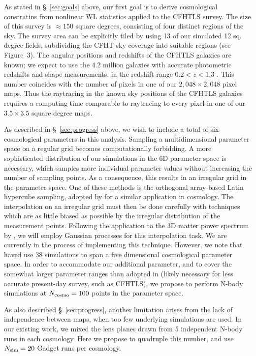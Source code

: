 \documentclass[10pt, preprint]{aastex}
\begin{document}
As stated in \S~\ref{sec:goals} above, our first goal is to derive
cosmological constratins from nonlinear WL statistics applied to the
CFHTLS survey.  The size of this survey is $\approx 150$ square
degrees, consisting of four distinct regions of the sky.  The survey
area can be explicitly tiled by using 13 of our simulated 12
sq. degree fields, subdividing the CFHT sky coverage into suitable
regions (see Figure~3).  The angular positions and redshifts of the
CFHTLS galaxies are known; we expect to use the 4.2 million galaxies
with accurate photometric redshifts and shape measurements, in the
redshift range $0.2 < z < 1.3$ \citep{Kilbinger2013}.  This number
coincides with the number of pixels in one of our $2,048\times2,048$
pixel maps. Thus the raytracing in the known sky positions of the
CFHTLS galaxies requires a computing time comparable to raytracing to
every pixel in one of our $3.5\times 3.5$ square degree maps.

As described in \S~\ref{sec:progress} above, we wish to include a
total of six cosmological parameters in this analysis.  Sampling a
multidimensional parameter space on a regular grid becomes
computationally forbidding. A more sophisticated distribution of our
simulations in the 6D parameter space is necessary, which samples more
individual parameter values without increasing the number of sampling
points. As a consequence, this results in an irregular grid in the
parameter space. One of these methods is the orthogonal array-based
Latin hypercube sampling, adopted by \cite{CoyoteII} for a similar
application in cosmology.  The interpolation on an irregular grid must
then be done carefully with techniques which are as little biased as
possible by the irregular distribution of the measurement
points. Following the application to the 3D matter power spectrum by
\cite{CoyoteII}, we will employ Gaussian processes for this
interpolation task. We are currently in the process of implementing
this technique.  However, we note that \cite{CoyoteII} haved use 38
simulations to span a five dimensional cosmological parameter
space. In order to accommodate our additional parameter, and to cover
the somewhat larger parameter ranges than adopted in \cite{CoyoteII}
(likely necessary for less accurate present-day survey, such as
CFHTLS), we propose to perform N-body simulations at $N_{\rm
  cosmo}=100$ points in the parameter space.

As also described \S~\ref{sec:progress}, another limitation arises
from the lack of independence between maps, when too few underlying
simulations are used.  In our existing work, we mixed the lens planes
drawn from 5 independent N-body runs in each cosmology. Here we
propose to quadruple this number, and use $N_{\rm sim}=20$ Gadget runs
per cosmology.
\end{document}
